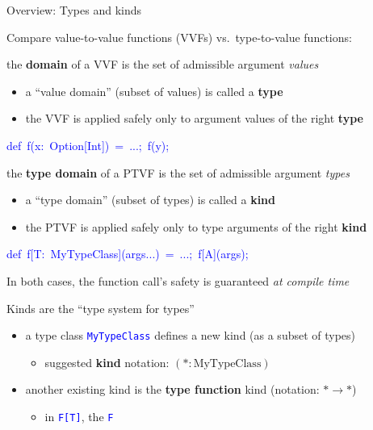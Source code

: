 \documentclass[english]{beamer}
\newenvironment{lyxcode}
   {\par\begin{list}{}{
     \setlength{\rightmargin}{\leftmargin}
     \setlength{\listparindent}{0pt}%
     \raggedright
     \setlength{\itemsep}{0pt}
     \setlength{\parsep}{0pt}
     \normalfont\ttfamily}%
    \def\{{\char`\{}
    \def\}{\char`\}}
    \def\textasciitilde{\char`\~}
    \item[]}
   {\end{list}}
\begin{document}
\begin{frame}{Overview: Types and kinds}

Compare value-to-value functions (VVFs) vs.\ type-to-value functions:
\begin{itemize}
\item the \textbf{domain} of a VVF is the set of admissible argument \emph{values}
\begin{itemize}
\item a ``value domain'' (subset of values) is called a \textbf{type}
\item the VVF is applied safely only to argument values of the right \textbf{type}
\end{itemize}
\begin{lyxcode}
\textcolor{blue}{\footnotesize{}def~f(x:~Option{[}Int{]})~=~...;~f(y);}{\footnotesize \par}
\end{lyxcode}
\item the \textbf{type domain} of a PTVF is the set of admissible argument
\emph{types}
\begin{itemize}
\item a ``type domain'' (subset of types) is called a \textbf{kind}
\item the PTVF is applied safely only to type arguments of the right \textbf{kind}
\end{itemize}
\begin{lyxcode}
\textcolor{blue}{\footnotesize{}def~f{[}T:~MyTypeClass{]}(args...)~=~...;~f{[}A{]}(args);}{\footnotesize \par}
\end{lyxcode}
\item In both cases, the function call's safety is guaranteed \emph{at compile
time}
\end{itemize}
Kinds are the ``type system for types''
\begin{itemize}
\item a type class \texttt{\textcolor{blue}{\footnotesize{}MyTypeClass}}
defines a new kind (as a subset of types)
\begin{itemize}
\item suggested \textbf{kind} notation:{\footnotesize{} $(*:\text{MyTypeClass})$}{\footnotesize \par}
\end{itemize}
\item another existing kind is the \textbf{type function} kind (notation:
$*\rightarrow*$)
\begin{itemize}
\item in \texttt{\textcolor{blue}{\footnotesize{}F{[}T{]}}}, the \texttt{\textcolor{blue}{\footnotesize{}F}}

\end{itemize}
\end{itemize}
\end{frame}
\end{document}
